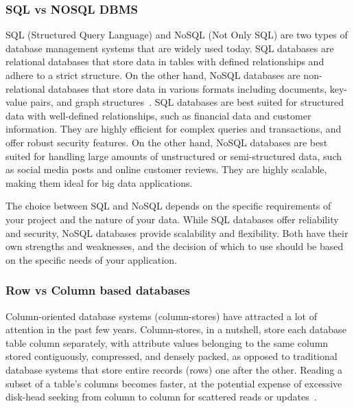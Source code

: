 \subsubsection{SQL vs NOSQL DBMS}
SQL (Structured Query Language) and NoSQL (Not Only SQL) are two types of database management systems that are widely used today. 
SQL databases are relational databases that store data in tables with defined relationships and adhere to a strict structure. 
On the other hand, NoSQL databases are non-relational databases that store data in various formats including documents, 
key-value pairs, and graph structures~\cite{M0M14}.
SQL databases are best suited for structured data with well-defined relationships, such as financial data and customer information. 
They are highly efficient for complex queries and transactions, and offer robust security features. 
On the other hand, NoSQL databases are best suited for handling large amounts of unstructured or semi-structured data, 
such as social media posts and online customer reviews. 
They are highly scalable, making them ideal for big data applications.

The choice between SQL and NoSQL depends on the specific requirements of your project and the nature of your data.
 While SQL databases offer reliability and security, NoSQL databases provide scalability and flexibility. 
 Both have their own strengths and weaknesses, and the decision of which to use should be based on the specific needs of your application.

\subsubsection{Row vs Column based databases}
Column-oriented database systems (column-stores) have attracted
a lot of attention in the past few years. Column-stores, in a
nutshell, store each database table column separately, with
attribute values belonging to the same column stored
contiguously, compressed, and densely packed, as opposed to
traditional database systems that store entire records (rows) one
after the other. Reading a subset of a table's columns becomes
faster, at the potential expense of excessive disk-head seeking
from column to column for scattered reads or updates~\cite{ABH09}.

